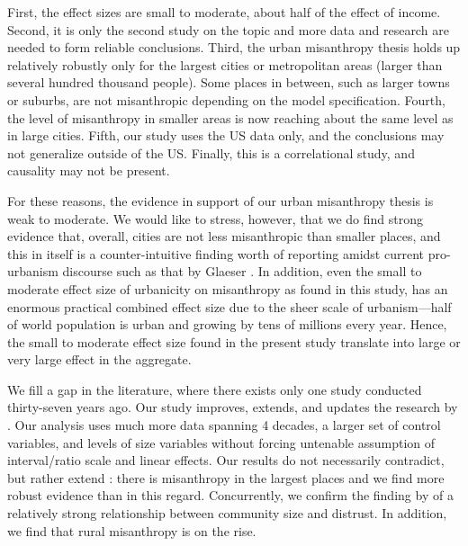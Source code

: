 \documentclass[11pt, letterpaper]{article}
\begin{document}
\begin{spacing}{1.4}
First, the effect sizes are small to moderate, about half of the
effect of income. Second, it is only the second study  \citep[after][]{wilson85} on the topic and more data and research are needed to form  reliable conclusions. Third, the urban
misanthropy thesis holds up relatively robustly only for the largest cities or metropolitan areas (larger than several hundred thousand people). Some places in between, such as larger towns or suburbs, are not misanthropic depending on the model specification. Fourth,
the level of misanthropy in smaller areas is now reaching about the same level
as in large cities. Fifth, our study uses the US data only, and the conclusions may not
generalize outside of the US. Finally, this is a correlational study, and causality
may not be present. 
% 

For these reasons, the evidence in support of our urban misanthropy thesis is
 weak to moderate.  We would like to stress, however, that we do find strong evidence that,
 overall,  cities are not less misanthropic than smaller places, and this in
 itself is a counter-intuitive finding worth of reporting amidst current
 pro-urbanism discourse such as that by Glaeser \citep[e.g.,][]{glaeser11}.
 In addition, even the small to moderate effect size of urbanicity on misanthropy
 as found in this study, has an enormous practical combined effect size due to the
 sheer scale of urbanism---half of world population is urban and growing by tens
 of millions every year. Hence, the small to moderate effect size found in the
 present study translate into large or very large effect in the aggregate. 

We fill a gap in the literature, where there exists only one
study conducted thirty-seven years ago. Our study improves, extends, and updates
the  research by \citet{wilson85}. Our analysis uses much more data spanning 4
decades, a larger set of control variables, and levels of size variables without
forcing untenable assumption of interval/ratio scale and linear effects. Our
results do not necessarily contradict, but rather extend \citet{wilson85}: there
is misanthropy in the largest places %
and we find more robust evidence than \citet{wilson85} in this regard. Concurrently, we confirm the finding by \citet{fischer81} of a relatively strong relationship between community size and distrust. In
addition, we  find that rural misanthropy is on the rise.



\end{spacing}
\end{document}
